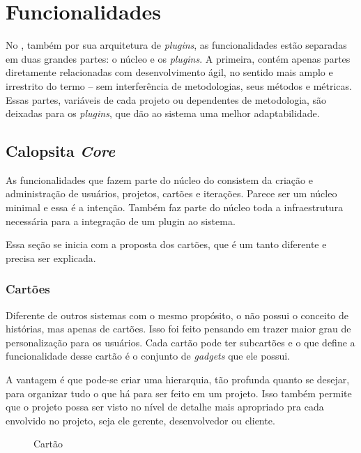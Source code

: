 \section{Funcionalidades}

No \calopsita{}, também por sua arquitetura de \textit{plugins}, as funcionalidades estão separadas em duas grandes partes: o núcleo e os \textit{plugins}. A primeira, contém apenas partes diretamente relacionadas com desenvolvimento ágil, no sentido mais amplo e irrestrito do termo -- sem interferência de metodologias, seus métodos e métricas. Essas partes, variáveis de cada projeto ou dependentes de metodologia, são deixadas para os \textit{plugins}, que dão ao sistema uma melhor adaptabilidade.

\subsection{Calopsita \textit{Core}}

As funcionalidades que fazem parte do núcleo do \calopsita{} consistem da criação e administração de usuários, projetos, cartões e iterações. Parece ser um núcleo minimal e essa é a intenção. Também faz parte do núcleo toda a infraestrutura necessária para a integração de um plugin ao sistema.

Essa seção se inicia com a proposta dos cartões, que é um tanto diferente e precisa ser explicada.

\subsubsection*{Cartões}

Diferente de outros sistemas com o mesmo propósito, o \calopsita{} não possui o conceito de histórias, mas apenas de cartões. Isso foi feito pensando em trazer maior grau de personalização para os usuários. Cada cartão pode ter subcartões e o que define a funcionalidade desse cartão é o conjunto de \textit{gadgets} que ele possui. 

A vantagem é que pode-se criar uma hierarquia, tão profunda quanto se desejar, para organizar tudo o que há para ser feito em um projeto. Isso também permite que o projeto possa ser visto no nível de detalhe mais apropriado pra cada envolvido no projeto, seja ele gerente, desenvolvedor ou cliente. 

\begin{figure}[H]
  \centering
  \caption{Cartão}\label{figura:cartao}
\end{figure}

